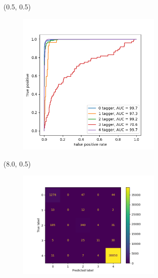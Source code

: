 \documentclass[12pt, xcolor={dvipsnames}, aspectratio = 169]{beamer}
\begin{document}
\begin{frame}

\begin{textblock}{7.0}(0.5, 0.5)
\begin{figure}
    \centering
    \includegraphics[width=7.0cm]{../imgs/roc-curve.png}
\end{figure}
\end{textblock}

\begin{textblock}{7.0}(8.0, 0.5)
\begin{figure}
    \centering
    \includegraphics[width=7.0cm]{../imgs/cls-cm.png}
\end{figure}
\end{textblock}

\end{frame}
\end{document}
